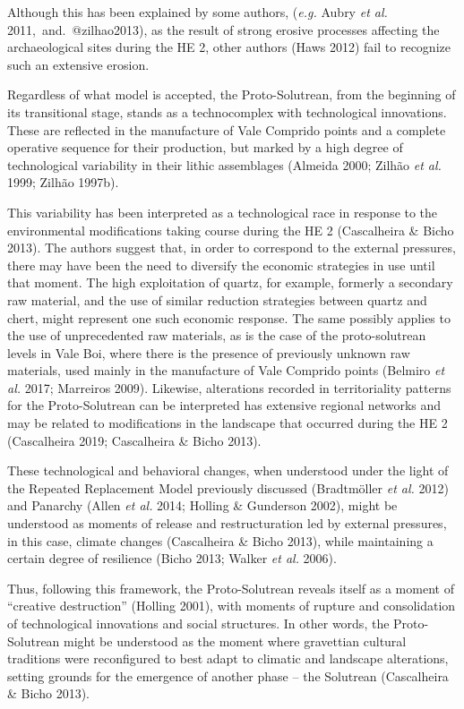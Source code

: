 \documentclass[12pt,twoside]{reedthesis}
\begin{document}
Although this has been explained by some authors, (\emph{e.g.} Aubry \emph{et al.} 2011,~and.~@zilhao2013), as the result of strong erosive processes affecting the archaeological sites during the HE 2, other authors (Haws 2012) fail to recognize such an extensive erosion.

Regardless of what model is accepted, the Proto-Solutrean, from the beginning of its transitional stage, stands as a technocomplex with technological innovations. These are reflected in the manufacture of Vale Comprido points and a complete operative sequence for their production, but marked by a high degree of technological variability in their lithic assemblages (Almeida 2000; Zilhão \emph{et al.} 1999; Zilhão 1997b).

This variability has been interpreted as a technological race in response to the environmental modifications taking course during the HE 2 (Cascalheira \& Bicho 2013). The authors suggest that, in order to correspond to the external pressures, there may have been the need to diversify the economic strategies in use until that moment. The high exploitation of quartz, for example, formerly a secondary raw material, and the use of similar reduction strategies between quartz and chert, might represent one such economic response. The same possibly applies to the use of unprecedented raw materials, as is the case of the proto-solutrean levels in Vale Boi, where there is the presence of previously unknown raw materials, used mainly in the manufacture of Vale Comprido points (Belmiro \emph{et al.} 2017; Marreiros 2009). Likewise, alterations recorded in territoriality patterns for the Proto-Solutrean can be interpreted has extensive regional networks and may be related to modifications in the landscape that occurred during the HE 2 (Cascalheira 2019; Cascalheira \& Bicho 2013).

These technological and behavioral changes, when understood under the light of the Repeated Replacement Model previously discussed (Bradtmöller \emph{et al.} 2012) and Panarchy (Allen \emph{et al.} 2014; Holling \& Gunderson 2002), might be understood as moments of release and restructuration led by external pressures, in this case, climate changes (Cascalheira \& Bicho 2013), while maintaining a certain degree of resilience (Bicho 2013; Walker \emph{et al.} 2006).

Thus, following this framework, the Proto-Solutrean reveals itself as a moment of ``creative destruction'' (Holling 2001), with moments of rupture and consolidation of technological innovations and social structures. In other words, the Proto-Solutrean might be understood as the moment where gravettian cultural traditions were reconfigured to best adapt to climatic and landscape alterations, setting grounds for the emergence of another phase -- the Solutrean (Cascalheira \& Bicho 2013).
\end{document}
